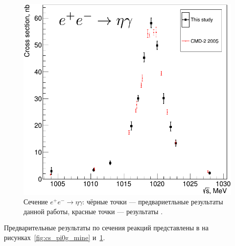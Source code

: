 \begin{figure}[htbp]
\begin{minipage}[t]{.48\textwidth}
		\includegraphics[width=\textwidth]{img/cs_etag_at_phi.png}
		\caption{Сечение $e^+ e^- \to \eta \gamma$:
			чёрные точки --- предвариетльные результаты данной работы,
			красные точки --- результаты \cite{Akhmetshin:2004gw}.}\label{fig:cs_etag_mine}
	\end{minipage}
\end{figure}

Предварительные результаты по сечения реакций представлены в на рисунках~\ref{fig:cs_pi0g_mine} и~\ref{fig:cs_etag_mine}.



